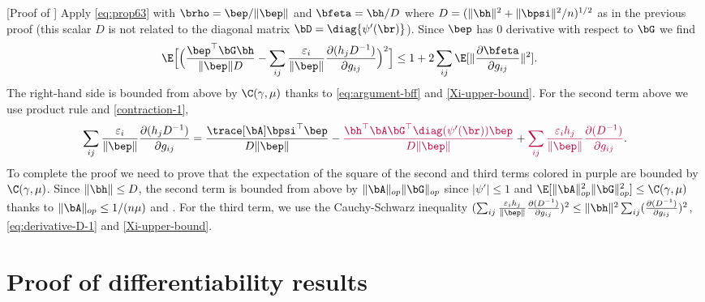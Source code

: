 \documentclass{colt2022} %
\renewenvironment{proof}[1][]
{
    \begin{newproof}
    \ifthenelse{\equal{#1}{}}{ }{\textbf{(#1) }}%
}{
    \end{newproof}
}
\def\eps{\varepsilon}
\numberwithin{equation}{section}
\begin{document}
\propXiVI*
\begin{proof} [Proof of ]
    Apply \eqref{eq:prop63}
    with $\brho=\bep/\|\bep\|$
    and $\bfeta = \bh/D$ where $D=(\|\bh\|^2 + \|\bpsi\|^2/n)^{1/2}$
    as in the previous proof
    (this scalar $D$ is not related to the diagonal matrix $\bD=\diag\{\psi'(\br)\}$).
    Since $\bep$ has 0 derivative with respect to $\bG$ we find
    \begin{align*}
        \E 
        \Bigl[ \Bigl( \frac{\bep ^{\top} \bG \bh}{\|\bep\|D} - \sum_{ij} \frac{\eps_i}{\|\bep\|} \frac{ \partial (h_{j} D^{-1}) }{ \partial g_{ij} } \Bigr)^{2} \Bigr] 
        &\leq
        1 + 2\sum_{ij}\E[
        \|\frac{\partial \bfeta}{\partial g_{ij}}\|^2
        ].
    \end{align*}
    The right-hand side
    is bounded from above by $\C(\gamma,\mu)$ thanks to \eqref{eq:argument-bff} and \eqref{Xi-upper-bound}.
    For the second term above we use product rule and \eqref{contraction-1},
    \begin{align*}
        \sum_{ij}
        \frac{\eps_i}{\|\bep\|}
        \frac{ \partial ( h_{j} D^{-1}) }{ \partial g_{ij} }
        =
        \frac{\trace [\bA ] \bpsi ^{\top} \bep }{D\|\bep\|}
        -{\color{purple}\frac{\bh^{\top} \bA \bG^{\top} \diag(\psi'(\br)) \bep}{D\|\bep\|} }
        +
        {\color{purple}
            \sum_{ij} \frac{\eps_{i} h_{j}}{\|\bep\|}
        \frac{ \partial (D^{-1}) }{ \partial g_{ij} }
        }
        .
    \end{align*}
    To complete the proof we need to prove that %
    the expectation of the square of the second and third terms
    colored in purple are bounded by $\C(\gamma,\mu)$.
    Since $\|\bh\|\le D$,
    the second term is bounded from above by
    $\|\bA\|_{op} \|\bG\|_{op}$ since $|\psi'|\le 1$
    and $\E[\|\bA\|_{op}^2 \|\bG\|_{op}^2]\le \C(\gamma,\mu)$
    thanks to $\|\bA\|_{op}\le 1/(n\mu)$ and
    \cite[Theorem II.13]{davidson2001local}.
    For the third term, we use
    the Cauchy-Schwarz inequality
    $(\sum_{ij} \frac{\eps_ih_j}{\|\bep\|}\frac{\partial(D^{-1})}{\partial g_{ij}})^2
    \le \|\bh\|^2 \sum_{ij} (\frac{\partial(D^{-1})}{\partial g_{ij}})^2$,
    \eqref{eq:derivative-D-1}
    and \eqref{Xi-upper-bound}.
\end{proof}

\section{Proof of differentiability results}
\label{sec:9}
\end{document}
